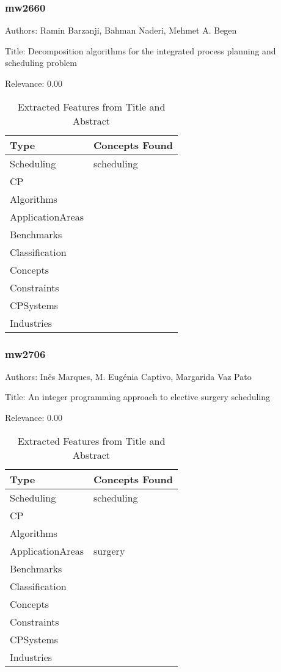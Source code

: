 \subsubsection{mw2660}
\label{mw:mw2660}

Authors: Ramin Barzanji, Bahman Naderi, Mehmet A. Begen

Title: Decomposition algorithms for the integrated process planning and scheduling problem

Relevance:  0.00

{\scriptsize
\begin{longtable}{p{2cm}p{20cm}}
\caption{Extracted Features from Title and Abstract}\\ \toprule
Type & Concepts Found\\ \midrule
\endhead
\bottomrule
\endfoot
Scheduling & scheduling\\ 
CP & \\ 
Algorithms & \\ 
ApplicationAreas & \\ 
Benchmarks & \\ 
Classification & \\ 
Concepts & \\ 
Constraints & \\ 
CPSystems & \\ 
Industries & \\ 
\end{longtable}
}



\subsubsection{mw2706}
\label{mw:mw2706}

Authors: Inês Marques, M. Eugénia Captivo, Margarida Vaz Pato

Title: An integer programming approach to elective surgery scheduling

Relevance:  0.00

{\scriptsize
\begin{longtable}{p{2cm}p{20cm}}
\caption{Extracted Features from Title and Abstract}\\ \toprule
Type & Concepts Found\\ \midrule
\endhead
\bottomrule
\endfoot
Scheduling & scheduling\\ 
CP & \\ 
Algorithms & \\ 
ApplicationAreas & surgery\\ 
Benchmarks & \\ 
Classification & \\ 
Concepts & \\ 
Constraints & \\ 
CPSystems & \\ 
Industries & \\ 
\end{longtable}
}



